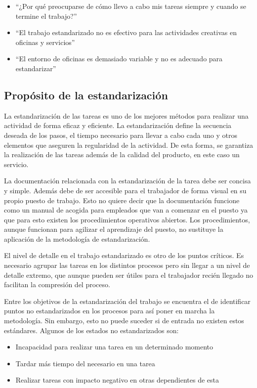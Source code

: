 \begin{itemize}
    \item ``¿Por qué preocuparse de cómo llevo a cabo mis tareas siempre y cuando se termine el trabajo?''
    \item ``El trabajo estandarizado no es efectivo para las actividades creativas en oficinas y servicios''
    \item ``El entorno de oficinas es demasiado variable y no es adecuado para estandarizar''
\end{itemize}

\subsection{Propósito de la estandarización}

La estandarización de las tareas es uno de los mejores métodos para realizar una actividad de forma eficaz y eficiente.
La estandarización define la secuencia deseada de los pasos, el tiempo necesario para llevar a cabo cada uno y otros elementos que aseguren la regularidad de la actividad.
De esta forma, se garantiza la realización de las tareas además de la calidad del producto, en este caso un servicio.

La documentación relacionada con la estandarización de la tarea debe ser concisa y simple.
Además debe de ser accesible para el trabajador de forma visual en su propio puesto de trabajo.
Esto no quiere decir que la documentación funcione como un manual de acogida para empleados que van a comenzar en el puesto ya que para esto existen los procedimientos operativos abiertos.
Los procedimientos, aunque funcionan para agilizar el aprendizaje del puesto, no sustituye la aplicación de la metodología de estandarización.

El nivel de detalle en el trabajo estandarizado es otro de los puntos críticos. Es necesario agrupar las tareas en los distintos procesos pero sin llegar a un nivel de detalle extremo, que aunque pueden ser útiles para el trabajador recién llegado no facilitan la compresión del proceso.

Entre los objetivos de la estandarización del trabajo se encuentra el de identificar puntos no estandarizados en los procesos para así poner en marcha la metodología.
Sin embargo, esto no puede suceder si de entrada no existen estos estándares.
Algunos de los estados no estandarizados son:

\begin{itemize}
    \item Incapacidad para realizar una tarea en un determinado momento
    \item Tardar más tiempo del necesario en una tarea
    \item Realizar tareas con impacto negativo en otras dependientes de esta
\end{itemize}

